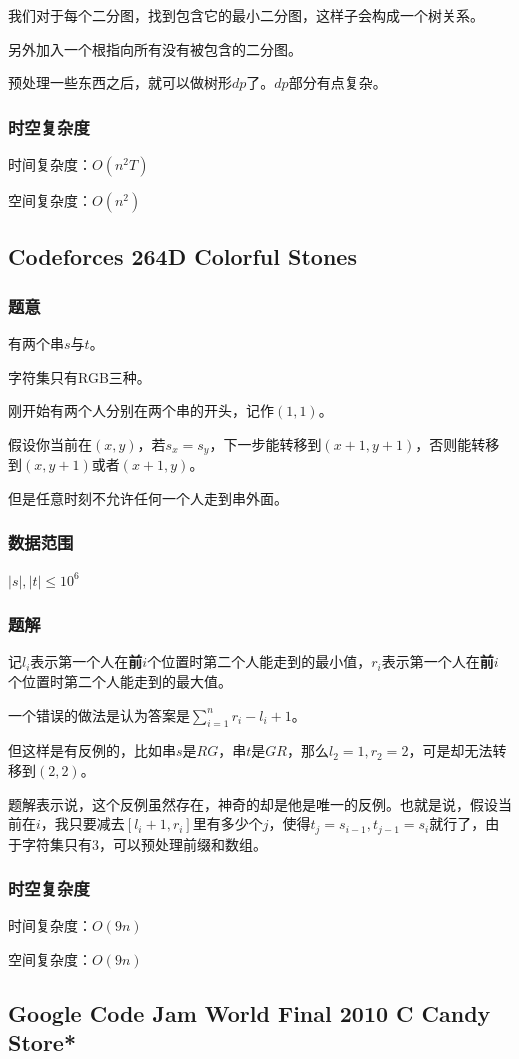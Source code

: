 \documentclass{ctexart}
\begin{document}
我们对于每个二分图，找到包含它的最小二分图，这样子会构成一个树关系。

另外加入一个根指向所有没有被包含的二分图。

预处理一些东西之后，就可以做树形$dp$了。$dp$部分有点复杂。
\subsubsection{时空复杂度}
时间复杂度：$O(n^2T)$

空间复杂度：$O(n^2)$
\subsection{Codeforces 264D Colorful Stones}
\subsubsection{题意}
有两个串$s$与$t$。

字符集只有RGB三种。

刚开始有两个人分别在两个串的开头，记作$(1,1)$。

假设你当前在$(x,y)$，若$s_x=s_y$，下一步能转移到$(x+1,y+1)$，否则能转移到$(x,y+1)$或者$(x+1,y)$。

但是任意时刻不允许任何一个人走到串外面。
\subsubsection{数据范围}
$|s|,|t| \le 10^6$
\subsubsection{题解}
记$l_i$表示第一个人在\textbf{前}$i$个位置时第二个人能走到的最小值，$r_i$表示第一个人在\textbf{前}$i$个位置时第二个人能走到的最大值。

一个错误的做法是认为答案是$\sum\limits_{i=1}^n r_i-l_i+1$。

但这样是有反例的，比如串$s$是$RG$，串$t$是$GR$，那么$l_2=1,r_2=2$，可是却无法转移到$(2,2)$。

题解表示说，这个反例虽然存在，神奇的却是他是唯一的反例。也就是说，假设当前在$i$，我只要减去$[l_i+1,r_i]$里有多少个$j$，使得$t_j=s_{i-1},t_{j-1}=s_i$就行了，由于字符集只有$3$，可以预处理前缀和数组。
\subsubsection{时空复杂度}
时间复杂度：$O(9n)$

空间复杂度：$O(9n)$
\subsection{Google Code Jam World Final 2010 C Candy Store*}
\end{document}
